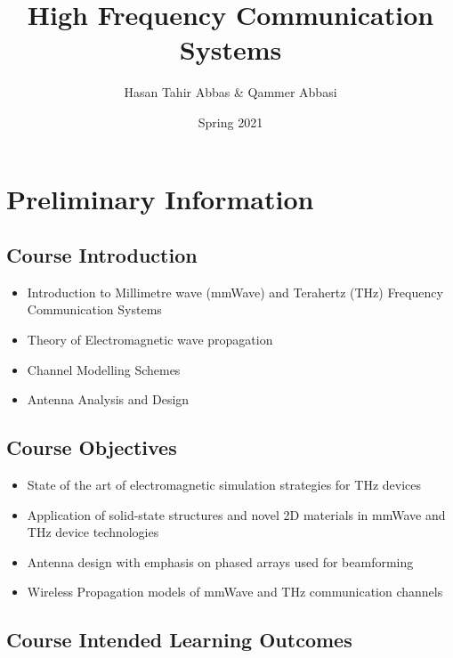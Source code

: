\documentclass[
]{article}
\title{High Frequency Communication Systems}
\author{Hasan Tahir Abbas \& Qammer Abbasi}
\date{Spring 2021}
\providecommand{\tightlist}{%
  \setlength{\itemsep}{0pt}\setlength{\parskip}{0pt}}
\begin{document}
\maketitle

\hypertarget{preliminary-information}{%
\section{Preliminary Information}\label{preliminary-information}}

\hypertarget{course-introduction}{%
\subsection{Course Introduction}\label{course-introduction}}

\begin{itemize}
\tightlist
\item
  Introduction to Millimetre wave (mmWave) and Terahertz (THz) Frequency
  Communication Systems
\item
  Theory of Electromagnetic wave propagation
\item
  Channel Modelling Schemes
\item
  Antenna Analysis and Design
\end{itemize}

\hypertarget{course-objectives}{%
\subsection{Course Objectives}\label{course-objectives}}

\begin{itemize}
\tightlist
\item
  State of the art of electromagnetic simulation strategies for THz
  devices
\item
  Application of solid-state structures and novel 2D materials in mmWave
  and THz device technologies
\item
  Antenna design with emphasis on phased arrays used for beamforming
\item
  Wireless Propagation models of mmWave and THz communication channels
\end{itemize}

\hypertarget{course-intended-learning-outcomes}{%
\subsection{Course Intended Learning
Outcomes}\label{course-intended-learning-outcomes}}
\end{document}

